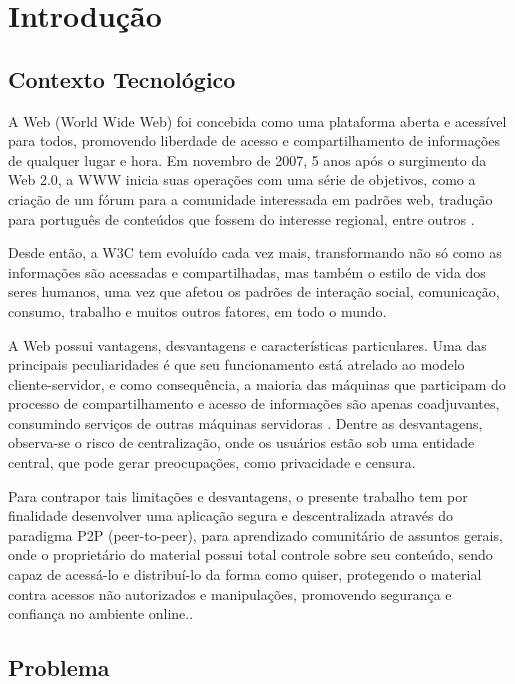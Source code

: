 \chapter[Introdução]{Introdução}


\section{Contexto Tecnológico}

A Web (World Wide Web) foi concebida como uma plataforma aberta e acessível para todos, promovendo liberdade de acesso e compartilhamento de informações de qualquer lugar e hora. Em novembro de 2007, 5 anos após o surgimento da Web 2.0, a WWW inicia suas operações com uma série de objetivos, como a criação de um fórum para a comunidade interessada em padrões web, tradução para português de conteúdos que fossem do interesse regional, entre outros \cite{vieira2014}.

Desde então, a W3C tem evoluído cada vez mais, transformando não só como as informações são acessadas e compartilhadas, mas também o estilo de vida dos seres humanos, uma vez que afetou os padrões de interação social, comunicação, consumo, trabalho e muitos outros fatores, em todo o mundo.

A Web possui vantagens, desvantagens e características particulares. Uma das principais peculiaridades é que seu funcionamento está atrelado ao modelo cliente-servidor, e como consequência, a maioria das máquinas que participam do processo de compartilhamento e acesso de informações são apenas coadjuvantes, consumindo serviços de outras máquinas servidoras \cite{rocha2004p2p}. Dentre as desvantagens, observa-se o risco de centralização, onde os usuários estão sob uma entidade central, que pode gerar preocupações, como privacidade e censura. 

Para contrapor tais limitações e desvantagens, o presente trabalho tem por finalidade desenvolver uma aplicação segura e descentralizada através do paradigma P2P (peer-to-peer), para aprendizado comunitário de assuntos gerais, onde o proprietário do material possui total controle sobre seu conteúdo, sendo capaz de acessá-lo e distribuí-lo da forma como quiser, protegendo o material contra acessos não autorizados e manipulações, promovendo segurança e confiança no ambiente online..

\section{Problema}


